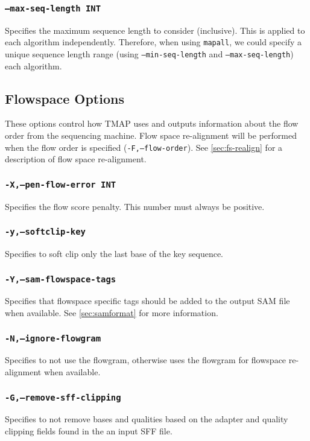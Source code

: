 \documentclass[a4paper,12pt]{book}
\newcommand{\TT}[1]{{\tt #1}} %
\begin{document}
\subsubsection{\TT{--max-seq-length INT}}
Specifies the maximum sequence length to consider (inclusive).
This is applied to each algorithm independently.
Therefore, when using \TT{mapall}, we could specify a unique sequence length range (using \TT{---min-seq-length} and \TT{---max-seq-length}) each algorithm.

\subsection{Flowspace Options}
These options control how TMAP uses and outputs information about the flow order from the sequencing machine.
Flow space re-alignment will be performed when the flow order is specified (\TT{-F,--flow-order}).
See \autoref{sec:fs-realign} for a description of flow space re-alignment.

\subsubsection{\TT{-X,--pen-flow-error INT}}
Specifies the flow score penalty.
This number must always be positive.

\subsubsection{\TT{-y,--softclip-key}}
Specifies to soft clip only the last base of the key sequence.

\subsubsection{\TT{-Y,--sam-flowspace-tags}}
Specifies that flowspace specific tags should be added to the output SAM file when available.
See \autoref{sec:samformat} for more information.

\subsubsection{\TT{-N,--ignore-flowgram}}
Specifies to not use the flowgram, otherwise uses the flowgram for flowspace re-alignment when available.

\subsubsection{\TT{-G,--remove-sff-clipping}}
Specifies to not remove bases and qualities based on the adapter and quality clipping fields found in the an input SFF file.
\end{document}
